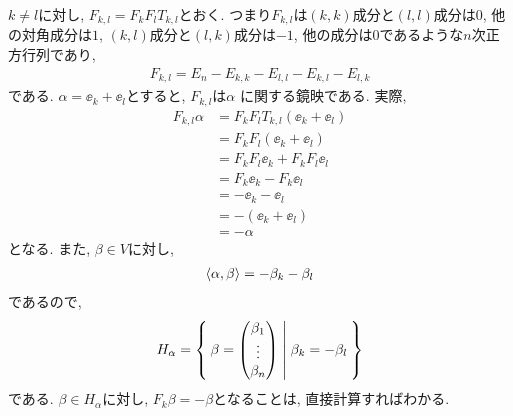 \begin{example}
  $k\neq l$に対し,
  $F_{k,l}=F_kF_lT_{k,l}$とおく.
  つまり$F_{k,l}$は$(k,k)$成分と$(l,l)$成分は$0$, 他の対角成分は$1$,
  $(k,l)$成分と$(l,k)$成分は$-1$, 他の成分は$0$であるような$n$次正方行列であり,
  \begin{align*}
    F_{k,l} = E_n-E_{k,k}-E_{l,l}-E_{k,l}-E_{l,k}
  \end{align*}
  である.
  $\alpha=\ee_k+\ee_l$とすると, $F_{k,l}$は$\alpha$ に関する鏡映である.
  実際,
  \begin{align*}
    F_{k,l} \alpha &= F_kF_lT_{k,l}(\ee_k+\ee_l)\\
    &= F_kF_l(\ee_k+\ee_l)\\
    &= F_kF_l\ee_k+F_kF_l\ee_l\\
    &= F_k\ee_k-F_k\ee_l\\
    &= -\ee_k-\ee_l\\
    &= -(\ee_k+\ee_l)\\
    &= -\alpha
  \end{align*}
  となる.
  また, $\beta\in V$に対し,
  \begin{align*}
    \Braket{\alpha,\beta}= -\beta_k-\beta_l 
  \end{align*}
  であるので,
  \begin{align*}
    H_\alpha = \Set{
      \beta=
      \begin{pmatrix}
        \beta_1\\
        \vdots\\
        \beta_n
      \end{pmatrix}
      | \beta_k=-\beta_l}
  \end{align*}
  である.  $\beta\in H_\alpha$に対し, 
  $F_k \beta = -\beta$となることは, 直接計算すればわかる.
\end{example}

